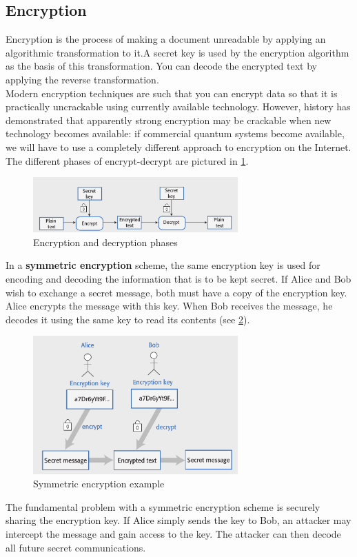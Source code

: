 \documentclass[10pt,a4paper]{report}
\begin{document}
\subsection{Encryption}
Encryption is the process of making a document unreadable by applying
an algorithmic transformation to it.A secret key is used by the encryption algorithm as the basis of this
transformation. You can decode the encrypted text by applying the reverse transformation.\\
Modern encryption techniques are such that you can encrypt data so that
it is practically uncrackable using currently available technology. However, history has demonstrated that apparently strong encryption
may be crackable when new technology becomes available: if commercial quantum systems become available, we will have to use a completely different approach to encryption on the Internet. The different phases of encrypt-decrypt are pictured in \ref{image88}.
\begin{figure}[h]
	\centering
	\includegraphics[width=0.7\textwidth]{image88}
	\caption{Encryption and decryption phases}
	\label{image88}
\end{figure} 

In a \textbf{symmetric encryption} scheme, the same encryption key is used for encoding and decoding the information that is to be kept secret. 
If Alice and Bob wish to exchange a secret message, both must have a
copy of the encryption key. Alice encrypts the message with this key.
When Bob receives the message, he decodes it using the same key to
read its contents (see \ref{image89}).
\begin{figure}[h]
	\centering
	\includegraphics[width=0.7\textwidth]{image89}
	\caption{Symmetric encryption example}
	\label{image89}
\end{figure} 
The fundamental problem with a symmetric encryption scheme is securely sharing the encryption key.
If Alice simply sends the key to Bob, an attacker may intercept the message and gain access to the key. The attacker can then decode all future secret communications.
\end{document}
